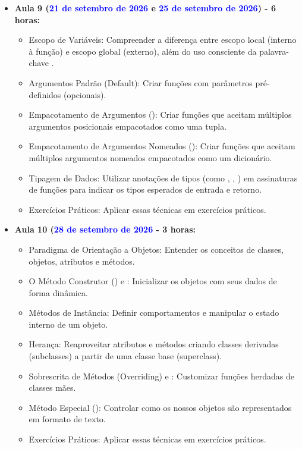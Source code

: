 \begin{itemize}
    \item \textbf{Aula 9 (\textcolor{blue}{21 de setembro de 2026} e \textcolor{blue}{25 de setembro de 2026}) - 6 horas:}

    \begin{itemize}\justifying
        \item Escopo de Variáveis: Compreender a diferença entre escopo local (interno à função) e escopo global (externo), além do uso consciente da palavra-chave .
        \item Argumentos Padrão (Default): Criar funções com parâmetros pré-definidos (opcionais).
        \item Empacotamento de Argumentos (): Criar funções que aceitam múltiplos argumentos posicionais empacotados como uma tupla.
        \item Empacotamento de Argumentos Nomeados (): Criar funções que aceitam múltiplos argumentos nomeados empacotados como um dicionário.
        \item Tipagem de Dados: Utilizar anotações de tipos (como , , ) em assinaturas de funções para indicar os tipos esperados de entrada e retorno.
        \item Exercícios Práticos: Aplicar essas técnicas em exercícios práticos.
    \end{itemize}


    \item \textbf{Aula 10 (\textcolor{blue}{28 de setembro de 2026} - 3 horas:}

    \begin{itemize}\justifying
        \item Paradigma de Orientação a Objetos: Entender os conceitos de classes, objetos, atributos e métodos.
        \item O Método Construtor () e : Inicializar os objetos com seus dados de forma dinâmica.
        \item Métodos de Instância: Definir comportamentos e manipular o estado interno de um objeto.
        \item Herança: Reaproveitar atributos e métodos criando classes derivadas (subclasses) a partir de uma classe base (superclass).
        \item Sobrescrita de Métodos (Overriding) e : Customizar funções herdadas de classes mães.
        \item Método Especial (): Controlar como os nossos objetos são representados em formato de texto.
        \item Exercícios Práticos: Aplicar essas técnicas em exercícios práticos.
    \end{itemize}


\end{itemize}
